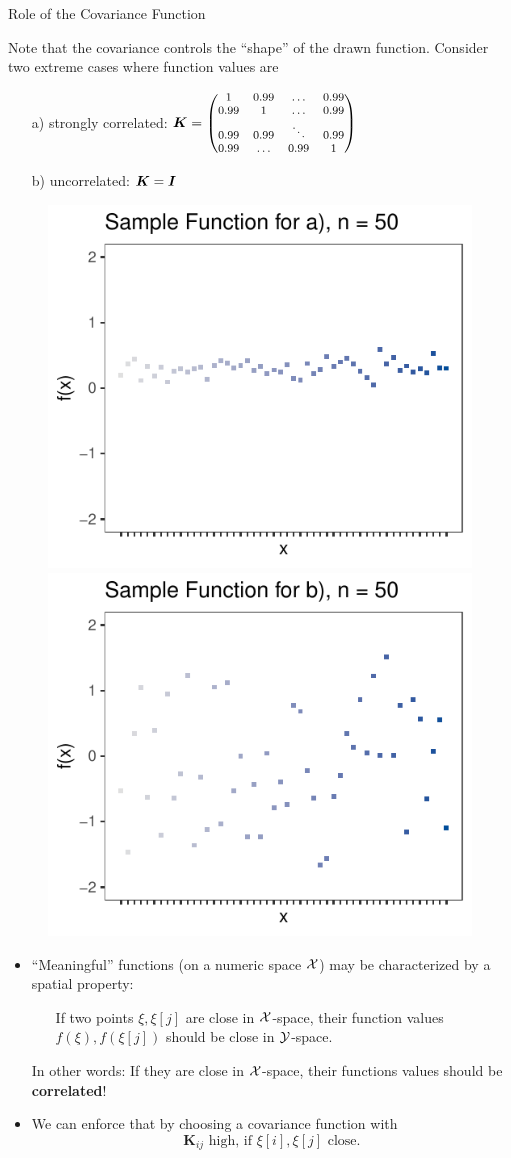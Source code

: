 \documentclass[11pt,compress,t,notes=noshow, xcolor=table]{beamer}
\begin{document}
\begin{vbframe}{Role of the Covariance Function}

Note that the covariance controls the \enquote{shape} of the drawn function. Consider two extreme cases where function values are

\begin{enumerate}
  \item[a)] strongly correlated: $\bm{K} = \begin{footnotesize}\begin{pmatrix} 1 & 0.99 & \dots & 0.99 \\
  0.99 & 1 & \dots & 0.99 \\
  0.99 & 0.99 & \ddots & 0.99 \\
  0.99 & \dots & 0.99 & 1 \end{pmatrix}\end{footnotesize}$
  \item[b)] uncorrelated: $\bm{K} = \boldsymbol{I}$
\end{enumerate}

\begin{figure}
  \includegraphics[width=0.35\linewidth]{figure/discrete/example_extreme_50_1.pdf} \includegraphics[width=0.35\linewidth]{figure/discrete/example_extreme_50_2.pdf}
\end{figure}


\framebreak

\begin{itemize}
  \item \enquote{Meaningful} functions (on a numeric space $\mathcal{X}$) may be characterized by a spatial property: \vspace*{0.2cm}
  \begin{itemize}
    \item[] If two points $\xi, \xi[j]$ are close in $\mathcal{X}$-space, their function values $f(\xi), f(\xi[j])$ should be close in $\mathcal{Y}$-space.
  \end{itemize} \vspace*{0.2cm}
  In other words: If they are close in $\mathcal{X}$-space, their functions values should be \textbf{correlated}! \vspace*{0.4cm}
  \item We can enforce that by choosing a covariance function with
  $$
    \bm{K}_{ij} \text{ high, if } \xi[i], \xi[j] \text{ close.}
  $$


\end{itemize}
\end{vbframe}
\end{document}
